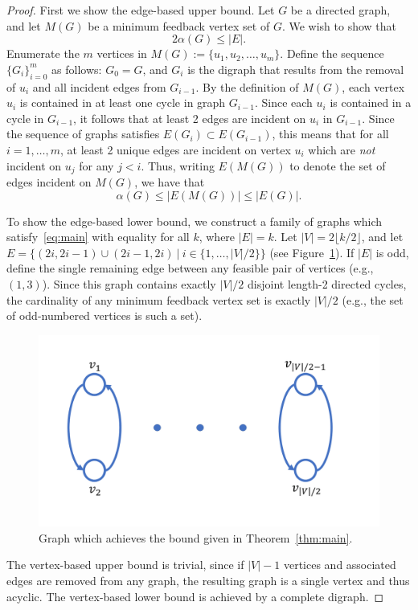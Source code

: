 \documentclass[CRMATH,Unicode,manuscript]{cedram}
\begin{document}
\begin{proof}
First we show the edge-based upper bound.
Let $G$ be a directed graph, and let $M(G)$ be a minimum feedback vertex set of $G$.
We wish to show that 
\begin{equation}
2\alpha(G)\leq |E|.
\end{equation}
Enumerate the $m$ vertices in $M(G):=\{u_1,u_2,\ldots,u_m\}$.
Define the sequence $\{G_i\}_{i=0}^m$ as follows: $G_0=G$, and $G_i$ is the digraph that results from the removal of $u_i$ and all incident edges from $G_{i-1}$.
By the definition of $M(G)$, each vertex $u_i$ is contained in at least one cycle in graph $G_{i-1}$.
Since each $u_i$ is contained in a cycle in $G_{i-1}$, it follows that at least 2 edges are incident on $u_i$ in $G_{i-1}$.
Since the sequence of graphs satisfies $E(G_{i})\subset E(G_{i-1})$, this means that for all $i=1,\ldots,m$, at least 2 unique edges are incident on vertex $u_i$ which are \emph{not} incident on $u_j$ for any $j<i$.
%
Thus, writing $E(M(G))$ to denote the set of edges incident on $M(G)$, we have that
\begin{equation}
\alpha(G)\leq|E(M(G))|\leq |E(G)|.
\end{equation}

To show the edge-based lower bound, we construct a family of graphs which satisfy~\eqref{eq:main} with equality for all $k$, where $|E|=k$.
Let $|V|=2\lfloor k/2\rfloor$, and let $E=\{(2i,2i-1)\cup(2i-1,2i)\ |\ i\in\{1,\ldots,|V|/2\}\}$ (see Figure~\ref{fig:graph}).
If $|E|$ is odd, define the single remaining edge between any feasible pair of vertices (e.g., $(1,3)$).
Since this graph contains exactly $|V|/2$ disjoint length-2 directed cycles, the cardinality of any minimum feedback vertex set is exactly $|V|/2$ (e.g., the set of odd-numbered vertices is such a set).
%

\begin{figure}
\centering
\includegraphics[width=.5\textwidth]{gfx/graph}
\caption{\label{fig:graph} Graph which achieves the bound given in Theorem~\ref{thm:main}.}
\end{figure}


The vertex-based upper bound is trivial, since if $|V|-1$ vertices and associated edges are removed from any graph, the resulting graph is a single vertex and thus acyclic.
The vertex-based lower bound is achieved by a complete digraph.
\end{proof}








\end{document}
